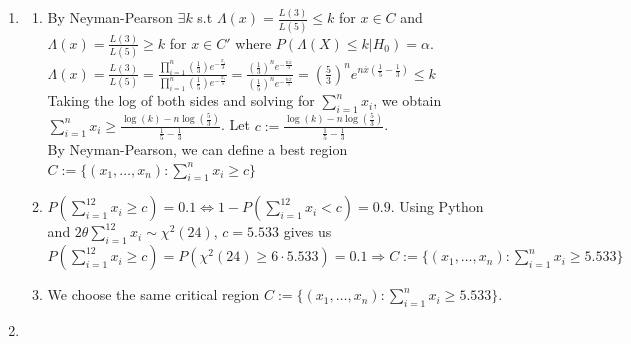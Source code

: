 \documentclass[10pt]{article}
\begin{document}
\begin{enumerate}[label=\textbf{Problem \arabic*.}]
\begin{enumerate}[label=\text{\arabic*.}]
\begin{figure}[H]
        \end{figure}
    \end{enumerate}
    \item \begin{enumerate}[label=\text{\arabic*.}]
        \item By Neyman-Pearson $\exists k$ s.t $\Lambda(x)=\frac{L(3)}{L(5)}\le k$ for $x\in C$ and $\Lambda(x)=\frac{L(3)}{L(5)}\ge k$ for $x\in C'$ where $P(\Lambda(X)\le k|H_0)=\alpha$.\\
        $\Lambda(x)=\frac{L(3)}{L(5)}=\frac{\displaystyle\prod_{i=1}^{n}{(\frac{1}{3})}e^{-\frac{x_i}{3}}}{\displaystyle\prod_{i=1}^{n}{(\frac{1}{5})}e^{-\frac{x_i}{5}}}=\frac{{(\frac{1}{3})}^n e^{-\frac{n\overline{x}}{3}}}{{(\frac{1}{5})}^n e^{-\frac{n\overline{x}}{5}}}={(\frac{5}{3})}^n e^{n\overline{x}(\frac{1}{5}-\frac{1}{3})}\le k$\\
        Taking the log of both sides and solving for $\displaystyle\sum_{i=1}^{n}x_i$, we obtain $\displaystyle\sum_{i=1}^{n}x_i\ge \frac{\log(k)-n\log(\frac{5}{3})}{\frac{1}{5}-\frac{1}{3}}$.
        Let $c:=\frac{\log(k)-n\log(\frac{5}{3})}{\frac{1}{5}-\frac{1}{3}}$.\\
        By Neyman-Pearson, we can define a best region $C:=\{(x_1,\ldots,x_{n}):\displaystyle\sum_{i=1}^{n}x_i\ge c\}$
        \item $P(\displaystyle\sum_{i=1}^{12}x_i\ge c)=0.1\Leftrightarrow 1-P(\displaystyle\sum_{i=1}^{12}x_i<c)=0.9$. 
        Using Python and $2\theta\displaystyle\sum_{i=1}^{12}x_i\sim \chi^2(24)$, $c=5.533$ gives us $P(\displaystyle\sum_{i=1}^{12}x_i\ge c)=P(\chi^2(24)\ge6\cdot 5.533)=0.1\Rightarrow C:=\{(x_1,\ldots,x_{n}):\displaystyle\sum_{i=1}^{n}x_i\ge 5.533\}$
        \item We choose the same critical region $C:=\{(x_1,\ldots,x_{n}):\displaystyle\sum_{i=1}^{n}x_i\ge 5.533\}$.
    \end{enumerate}  
    \item {}
\end{enumerate}
\end{document}
